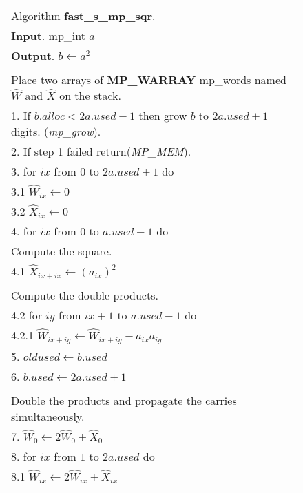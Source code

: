 \documentclass[b5paper]{book}
\begin{document}
\newpage\begin{figure}[!here]
\begin{small}
\begin{center}
\begin{tabular}{l}
\hline Algorithm \textbf{fast\_s\_mp\_sqr}. \\
\textbf{Input}.   mp\_int $a$ \\
\textbf{Output}.  $b \leftarrow a^2$ \\
\hline \\
Place two arrays of \textbf{MP\_WARRAY} mp\_words named $\hat W$ and $\hat {X}$ on the stack. \\
1.  If $b.alloc < 2a.used + 1$ then grow $b$ to $2a.used + 1$ digits.  (\textit{mp\_grow}). \\
2.  If step 1 failed return(\textit{MP\_MEM}). \\
3.  for $ix$ from $0$ to $2a.used + 1$ do \\
\hspace{3mm}3.1  $\hat W_{ix} \leftarrow 0$ \\
\hspace{3mm}3.2  $\hat {X}_{ix} \leftarrow 0$ \\
4.  for $ix$ from $0$ to $a.used - 1$ do \\
\hspace{3mm}Compute the square.\\
\hspace{3mm}4.1  $\hat {X}_{ix+ix} \leftarrow \left ( a_{ix} \right )^2$ \\
\\
\hspace{3mm}Compute the double products.\\
\hspace{3mm}4.2  for $iy$ from $ix + 1$ to $a.used - 1$ do \\
\hspace{6mm}4.2.1  $\hat W_{ix+iy} \leftarrow \hat W_{ix+iy} + a_{ix}a_{iy}$ \\
5.  $oldused \leftarrow b.used$ \\
6.  $b.used \leftarrow 2a.used + 1$ \\
\\
Double the products and propagate the carries simultaneously. \\
7.  $\hat W_0 \leftarrow 2 \hat W_0 + \hat {X}_0$ \\
8.  for $ix$ from $1$ to $2a.used$ do \\
\hspace{3mm}8.1 $\hat W_{ix} \leftarrow 2 \hat W_{ix} + \hat {X}_{ix}$ \\

\end{tabular}
\end{center}
\end{small}
\end{figure}
\end{document}
